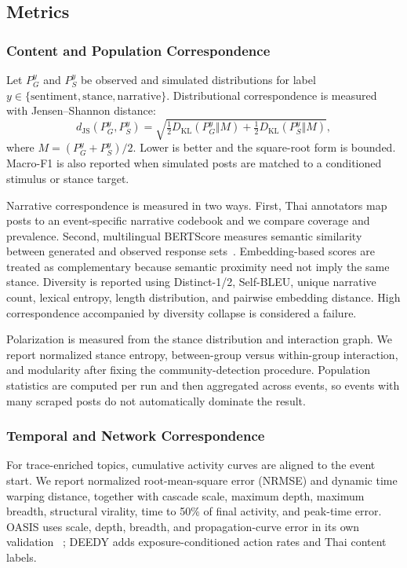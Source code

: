 \documentclass[conference]{IEEEtran}
\begin{document}
\subsection{Metrics}

\subsubsection{Content and Population Correspondence}

Let $P_G^y$ and $P_S^y$ be observed and simulated distributions for label
$y\in\{\text{sentiment},\text{stance},\text{narrative}\}$. Distributional
correspondence is measured with Jensen--Shannon distance:
\begin{equation}
 d_{\mathrm{JS}}(P_G^y,P_S^y)=
 \sqrt{\tfrac{1}{2}D_{\mathrm{KL}}(P_G^y\Vert M)+
 \tfrac{1}{2}D_{\mathrm{KL}}(P_S^y\Vert M)},
\end{equation}
where $M=(P_G^y+P_S^y)/2$. Lower is better and the square-root form is bounded.
Macro-F1 is also reported when simulated posts are matched to a conditioned
stimulus or stance target.

Narrative correspondence is measured in two ways. First, Thai annotators map
posts to an event-specific narrative codebook and we compare coverage and
prevalence. Second, multilingual BERTScore measures semantic similarity between
generated and observed response sets~\cite{zhang2020bertscore}. Embedding-based
scores are treated as complementary because semantic proximity need not imply
the same stance. Diversity is reported using Distinct-1/2, Self-BLEU, unique
narrative count, lexical entropy, length distribution, and pairwise embedding
distance. High correspondence accompanied by diversity collapse is considered
a failure.

Polarization is measured from the stance distribution and interaction graph.
We report normalized stance entropy, between-group versus within-group
interaction, and modularity after fixing the community-detection procedure.
Population statistics are computed per run and then aggregated across events,
so events with many scraped posts do not automatically dominate the result.

\subsubsection{Temporal and Network Correspondence}

For trace-enriched topics, cumulative activity curves are aligned to the event
start. We report normalized root-mean-square error (NRMSE) and dynamic time
warping distance, together with cascade scale, maximum depth, maximum breadth,
structural virality, time to 50\% of final activity, and peak-time error. OASIS
uses scale, depth, breadth, and propagation-curve error in its own validation
~\cite{yang2024oasis}; DEEDY adds exposure-conditioned action rates and Thai
content labels.
\end{document}
